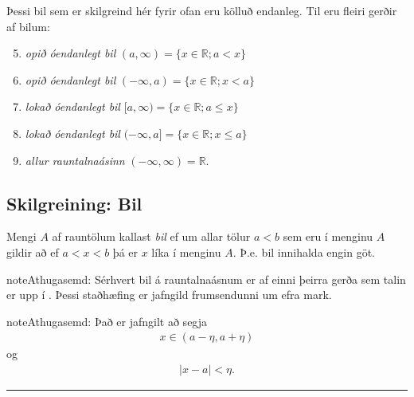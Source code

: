 \documentclass[a4paper,10pt,icelandic]{sphinxmanual}
\begin{document}
Þessi bil sem er skilgreind hér fyrir ofan eru kölluð endanleg. Til eru
fleiri gerðir af bilum:
\begin{enumerate}
\setcounter{enumi}{4}
\item {} 
\emph{opið óendanlegt bil} \((a,\infty)=\{x\in \mathbb{R}; a<x\}\)

\item {} 
\emph{opið óendanlegt bil} \((-\infty, a)=\{x\in \mathbb{R}; x<a\}\)

\item {} 
\emph{lokað óendanlegt bil} \([a,\infty)=\{x\in \mathbb{R}; a\leq x\}\)

\item {} 
\emph{lokað óendanlegt bil} \((-\infty, a]=\{x\in \mathbb{R}; x\leq a\}\)

\item {} 
\emph{allur rauntalnaásinn} \((-\infty, \infty)= \mathbb{R}\).

\end{enumerate}


\subsection{Skilgreining: Bil}
\label{kafli01:id1}
Mengi \(A\) af rauntölum kallast \textit{bil} ef um allar
tölur \(a<b\) sem eru í menginu \(A\) gildir að ef \(a<x<b\)
þá er \(x\) líka í menginu \(A\). Þ.e. bil innihalda engin göt.

\begin{notice}{note}{Athugasemd:}
Sérhvert bil á rauntalnaásnum er af einni þeirra gerða sem talin er
upp í {\hyperref[kafli01:skilgreining\string-1\string-3\string-1]{}}. Þessi staðhæfing er jafngild frumsendunni um
efra mark.
\end{notice}

\begin{notice}{note}{Athugasemd:}
Það er jafngilt að segja
\begin{equation*}
\begin{split}x \in (a-\eta,a+\eta)\end{split}
\end{equation*}
og
\begin{equation*}
\begin{split}|x-a| < \eta.\end{split}
\end{equation*}\end{notice}


\bigskip\hrule{}\bigskip
\end{document}
